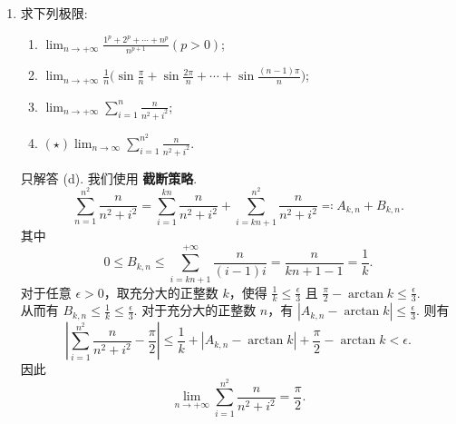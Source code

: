 \begin{enumerate}
    \item[4.]求下列极限:
    \begin{enumerate}
        \item[(a)]$\displaystyle \lim_{n\to +\infty}{\frac{1^{p}+2^{p}+\cdots+n^{p}}{n^{p+1}}} (p>0)$;
        \item[(b)]$\displaystyle \lim_{n\to +\infty}{\frac{1}{n}}\Big(\sin {\frac{\pi}{n}} + \sin {\frac{2\pi}{n}} + \cdots +\sin {\frac{(n - 1)\pi}{n}}\Big)$;
        \item[(c)]$\displaystyle \lim_{n\to +\infty}\sum_{i = 1}^{n}{\frac{n}{n^{2} + i^{2}}}$;
        \item[(d)]$\displaystyle (\star)\lim_{n\to \infty}\sum_{i = 1}^{n^2}{\frac{n}{n^{2} + i^{2}}}$.
    \end{enumerate}
    \begin{solution}
        只解答 (d). 我们使用 \textbf{截断策略}.
        \[
            \sum_{n=1}^{n^2}\frac{n}{n^2+i^2}=\sum_{i=1}^{kn}\frac{n}{n^2+i^2}+\sum_{i=kn+1}^{n^2}\frac{n}{n^2+i^2}\eqqcolon A_{k,n}+B_{k,n}.
        \]
        其中
        \[
            0\leq B_{k,n}\leq \sum_{i=kn+1}^{+\infty}\frac{n}{(i-1)i}=\frac{n}{kn+1-1}=\frac{1}{k}.
        \]
        对于任意 $\epsilon>0$，取充分大的正整数 $k$，使得 $\displaystyle \frac{1}{k}\leq \frac{\epsilon}{3}$ 且 $\displaystyle \frac{\pi}{2}-\arctan{k}\leq \frac{\epsilon}{3}$.\\
        从而有 $\displaystyle B_{k,n}\leq\frac{1}{k}\leq\frac{\epsilon}{3}$. 对于充分大的正整数 $n$，有 $\displaystyle \left| A_{k,n}-\arctan{k} \right|\leq\frac{\epsilon}{3}$.
        则有
        \[
            \left| \sum_{i=1}^{n^2}\frac{n}{n^2+i^2}-\frac{\pi}{2} \right|\leq \frac{1}{k}+\left| A_{k,n} -\arctan{k} \right|+\frac{\pi}{2}-\arctan{k}<\epsilon.
        \]
        因此
        \[
            \lim_{n\to+\infty}\sum_{i=1}^{n^2}\frac{n}{n^2+i^2}=\frac{\pi}{2}.
        \]
    \end{solution}


\end{enumerate}
